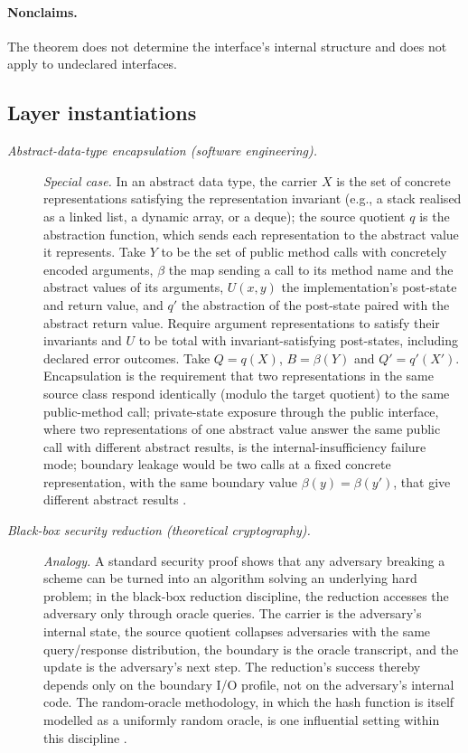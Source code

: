 \paragraph{Nonclaims.} The theorem does not determine the interface's internal structure and
does not apply to undeclared interfaces.

\subsection*{Layer instantiations}\label{layer-inst:F22}

\begingroup\small
\begin{description}
\item[\emph{Abstract-data-type encapsulation (software
engineering).}] \textit{Special case.}
In an abstract data type, the carrier \(X\) is the set of
concrete representations satisfying the representation invariant (e.g., a stack realised as a
linked list, a dynamic array, or a deque); the source
quotient \(q\) is the abstraction function, which sends each
representation to the abstract value it represents. Take \(Y\) to be the set of public method calls with concretely encoded arguments, \(\beta\) the map sending a call to its method name and the abstract values of its arguments, \(U(x,y)\) the implementation's post-state and return value, and \(q'\) the abstraction of the post-state paired with the abstract return value. Require argument representations to satisfy their invariants and \(U\) to be total with invariant-satisfying post-states, including declared error outcomes. Take \(Q=q(X)\), \(B=\beta(Y)\) and \(Q'=q'(X')\).  Encapsulation is the
requirement that two representations in the same source
class respond identically (modulo the target quotient)
to the same public-method call; private-state exposure
through the public interface, where two representations of one abstract
value answer the same public call with different abstract results, is the
internal-insufficiency failure mode; boundary leakage would be
two calls at a fixed concrete representation, with the same
boundary value \(\beta(y)=\beta(y')\), that give different
abstract results \citep{LiskovZilles1974ADT}.

\item[\emph{Black-box security reduction
(theoretical cryptography).}] \textit{Analogy.}
A standard security proof shows that any adversary
breaking a scheme can be turned into an algorithm
solving an underlying hard problem; in the black-box
reduction discipline, the reduction accesses the
adversary only through oracle queries.  The carrier is
the adversary's internal state, the source quotient
collapses adversaries with the same query/response
distribution, the boundary is the oracle transcript,
and the update is the adversary's next step.  The
reduction's success thereby depends only on the
boundary I/O profile, not on the adversary's internal
code.  The random-oracle methodology, in which the hash
function is itself modelled as a uniformly random
oracle, is one influential setting within this
discipline \citep{BellareRogaway1993RandomOracles}.

\end{description}
\endgroup


